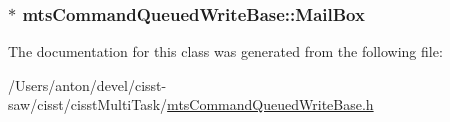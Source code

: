 \subsubsection[{Mail\+Box}]{$\ast$ mts\+Command\+Queued\+Write\+Base\+::\+Mail\+Box\hspace{0.3cm}{\ttfamily [protected]}}\label{classmts_command_queued_write_base_aff12f0b8e184ae4891388a5c0c647724}


The documentation for this class was generated from the following file\+:\begin{DoxyCompactItemize}
\item 
/\+Users/anton/devel/cisst-\/saw/cisst/cisst\+Multi\+Task/\hyperlink{mts_command_queued_write_base_8h}{mts\+Command\+Queued\+Write\+Base.\+h}\end{DoxyCompactItemize}
